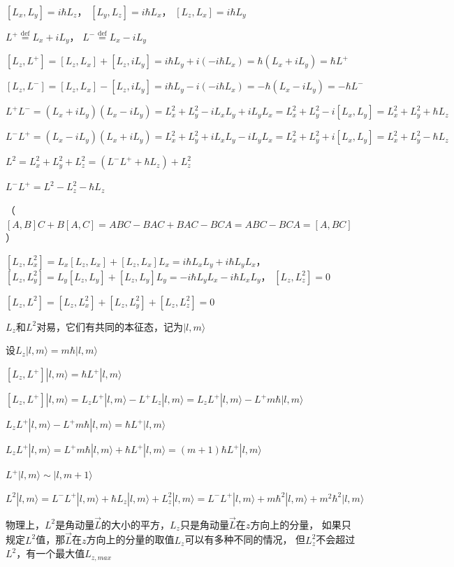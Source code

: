 $[L_{x}, L_{y}]=i\hbar L_{z}$，
$[L_{y}, L_{z}]=i\hbar L_{x}$，
$[L_{z}, L_{x}]=i\hbar L_{y}$

$L^{+}\stackrel{\text{def}}{=}L_x+iL_y$，
$L^{-}\stackrel{\text{def}}{=}L_x-iL_y$

$[L_z,L^{+}]=[L_z,L_x]+[L_z,iL_y]=i\hbar L_y+i(-i\hbar L_x)=\hbar (L_x+iL_y)=\hbar L^{+}$

$[L_z,L^{-}]=[L_z,L_x]-[L_z,iL_y]=i\hbar L_y-i(-i\hbar L_x)=-\hbar (L_x-iL_y)=-\hbar L^{-}$

\bigskip

$L^{+}L^{-}=(L_x+iL_y)(L_x-iL_y)=L_x^2+L_y^2-iL_xL_y+iL_yL_x=L_x^2+L_y^2-i[L_x,L_y]=L_x^2+L_y^2+\hbar L_z$

$L^{-}L^{+}=(L_x-iL_y)(L_x+iL_y)=L_x^2+L_y^2+iL_xL_y-iL_yL_x=L_x^2+L_y^2+i[L_x,L_y]=L_x^2+L_y^2-\hbar L_z$

$L^{2}=L_x^2+L_y^2+L_z^2=(L^{-}L^{+}+\hbar L_z)+L_z^2$

$L^{-}L^{+}=L^{2}-L_z^2-\hbar L_z$

\bigskip

（$[A,B]C+B[A,C]=ABC-BAC+BAC-BCA=ABC-BCA=[A,BC]$）

$[L_z,L_x^2]=L_x[L_z,L_x]+[L_z,L_x]L_x=i\hbar L_xL_y+i\hbar L_yL_x$，
$[L_z,L_y^2]=L_y[L_z,L_y]+[L_z,L_y]L_y=-i\hbar L_yL_x-i\hbar L_xL_y$，
$[L_z,L_z^2]=0$

$[L_z,L^2]=[L_z,L_x^2]+[L_z,L_y^2]+[L_z,L_z^2]=0$

$L_z$和$L^2$对易，它们有共同的本征态，记为$|l,m\rangle$

设$L_z|l,m\rangle=m\hbar |l,m\rangle$

\bigskip

$[L_z,L^{+}]|l,m\rangle=\hbar L^{+}|l,m\rangle$

$[L_z,L^{+}]|l,m\rangle=L_zL^{+}|l,m\rangle-L^{+}L_z|l,m\rangle=L_zL^{+}|l,m\rangle-L^{+}m\hbar|l,m\rangle$

$L_zL^{+}|l,m\rangle-L^{+}m\hbar|l,m\rangle=\hbar L^{+}|l,m\rangle$

$L_zL^{+}|l,m\rangle=L^{+}m\hbar|l,m\rangle+\hbar L^{+}|l,m\rangle=(m+1)\hbar L^{+}|l,m\rangle$

$L^{+}|l,m\rangle\sim |l,m+1\rangle$

\bigskip

$L^2|l,m\rangle=L^{-}L^{+}|l,m\rangle+\hbar L_z|l,m\rangle+L_z^2|l,m\rangle=L^{-}L^{+}|l,m\rangle+m\hbar^2|l,m\rangle+m^2\hbar^2|l,m\rangle$

物理上，$L^2$是角动量$\overrightarrow{L}$的大小的平方，$L_z$只是角动量$\overrightarrow{L}$在$z$方向上的分量，
如果只规定$L^2$值，那$\overrightarrow{L}$在$z$方向上的分量的取值$L_z$可以有多种不同的情况，
但$L_z^2$不会超过$L^2$，有一个最大值$L_{z,max}$

